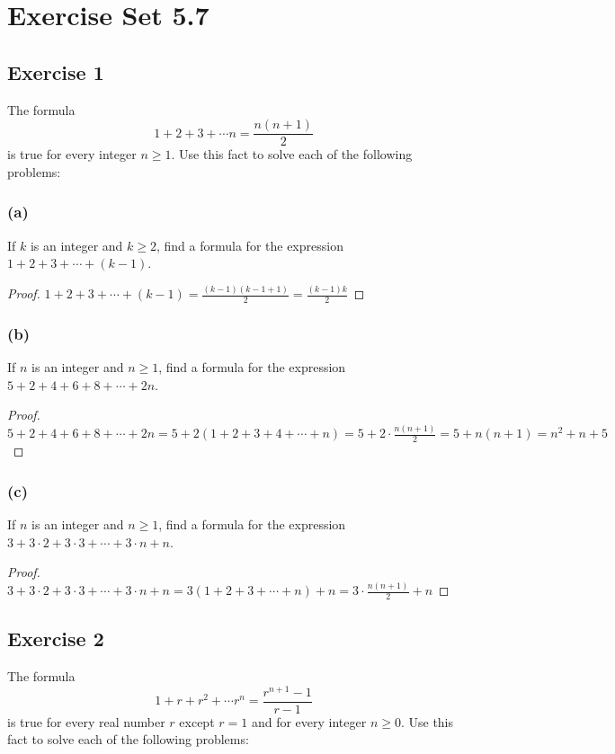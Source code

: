 \documentclass[14pt]{extarticle}
\begin{document}
\section{Exercise Set 5.7}

\subsection{Exercise 1}
The formula
\[
1 + 2 + 3 + \cdots n = \frac{n(n+1)}{2}
\]
is true for every integer \(n \geq 1\). Use this fact to solve each of the following problems:

\subsubsection{(a)}
If $k$ is an integer and \(k \geq 2\), find a formula for
the expression \(1 + 2 + 3 + \cdots + (k - 1)\).

\begin{proof}
\(1 + 2 + 3 + \cdots + (k - 1) = \frac{(k-1)(k-1+1)}{2} = \frac{(k-1)k}{2}\)
\end{proof}

\subsubsection{(b)}
If $n$ is an integer and \(n \geq 1\), find a formula for
the expression \(5 + 2 + 4 + 6 + 8 + \cdots + 2n\).

\begin{proof}
\(5 + 2 + 4 + 6 + 8 + \cdots + 2n = 5 + 2(1 + 2 + 3 + 4 + \cdots + n) = 5 + 2 \cdot \frac{n(n+1)}{2} = 5 + n(n+1) = n^2 + n + 5\)
\end{proof}

\subsubsection{(c)}
If $n$ is an integer and \(n \geq 1\), find a formula for
the expression \(3 + 3 \cdot 2 + 3 \cdot 3 + \cdots + 3 \cdot n + n\).

\begin{proof}
\(3 + 3 \cdot 2 + 3 \cdot 3 + \cdots + 3 \cdot n + n = 3(1 + 2 + 3 + \cdots + n) + n = 3 \cdot \frac{n(n+1)}{2} + n\)
\end{proof}

\subsection{Exercise 2}
The formula
\[
1 + r + r^2 + \cdots r^n = \frac{r^{n+1} - 1}{r-1}
\]
is true for every real number $r$ except \(r = 1\) and for every integer \(n \geq 0\). 
Use this fact to solve each of the following problems:
\end{document}
